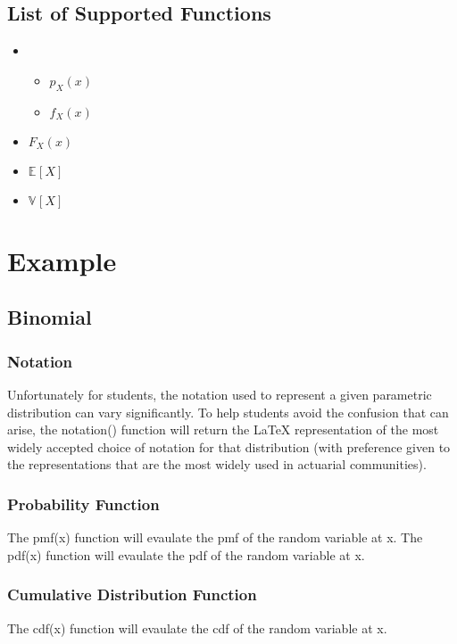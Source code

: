 \documentclass{article}
\newcommand{\E}[2][]{\ensuremath{\mathbb{E}_{#1}\left[#2\right]}}
\newcommand{\V}[2][]{\ensuremath{\mathbb{V}_{#1}\left[#2\right]}}
\begin{document}
\subsection{List of Supported Functions}
\begin{itemize}
    \item {}
    \begin{itemize}
        \item {} $ p_X(x) $
        \item {} $ f_X(x) $
    \end{itemize}
    \item {} $ F_X(x) $
    \item {} $ \E{X} $
    \item {} $ \V{X} $
\end{itemize}

\section{Example}
\subsection{Binomial}
\subsubsection{Notation}
Unfortunately for students, the notation used to represent a given parametric distribution
can vary significantly. To help students avoid the confusion that can arise,
the notation() function will return the LaTeX representation of the most widely
accepted choice of notation for that distribution (with preference given to the
representations that are the most widely used in  actuarial communities). \\
\subsubsection{Probability Function}
The pmf(x) function will evaulate the pmf of the random variable at x.
The pdf(x) function will evaulate the pdf of the random variable at x.
\subsubsection{Cumulative Distribution Function}
The cdf(x) function will evaulate the cdf of the random variable at x.
\end{document}
